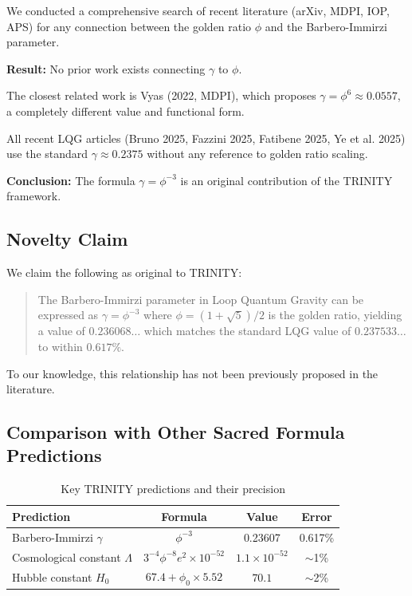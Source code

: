 We conducted a comprehensive search of recent literature (arXiv, MDPI, IOP, APS) for any connection between the golden ratio $\phi$ and the Barbero-Immirzi parameter.

\textbf{Result:} No prior work exists connecting $\gamma$ to $\phi$.

The closest related work is Vyas (2022, MDPI), which proposes $\gamma = \phi^6 \approx 0.0557$, a completely different value and functional form.

All recent LQG articles (Bruno 2025, Fazzini 2025, Fatibene 2025, Ye et al. 2025) use the standard $\gamma \approx 0.2375$ without any reference to golden ratio scaling.

\textbf{Conclusion:} The formula $\gamma = \phi^{-3}$ is an original contribution of the TRINITY framework.

\subsection{Novelty Claim}

We claim the following as original to TRINITY:

\begin{quote}
The Barbero-Immirzi parameter in Loop Quantum Gravity can be expressed as $\gamma = \phi^{-3}$ where $\phi = (1+\sqrt{5})/2$ is the golden ratio, yielding a value of $0.236068\ldots$ which matches the standard LQG value of $0.237533\ldots$ to within $0.617\%$.
\end{quote}

To our knowledge, this relationship has not been previously proposed in the literature.

\subsection{Comparison with Other Sacred Formula Predictions}

\begin{table}[h]
\centering
\begin{tabular}{lccc}
\hline
\textbf{Prediction} & \textbf{Formula} & \textbf{Value} & \textbf{Error} \\
\hline
Barbero-Immirzi $\gamma$ & $\phi^{-3}$ & 0.23607 & 0.617\% \\
Cosmological constant $\Lambda$ & $3^{-4}\phi^{-8}e^2 \times 10^{-52}$ & $1.1 \times 10^{-52}$ & $\sim$1\% \\
Hubble constant $H_0$ & $67.4 + \phi_0 \times 5.52$ & $70.1$ & $\sim$2\% \\
\hline
\end{tabular}
\caption{Key TRINITY predictions and their precision}
\end{table}

